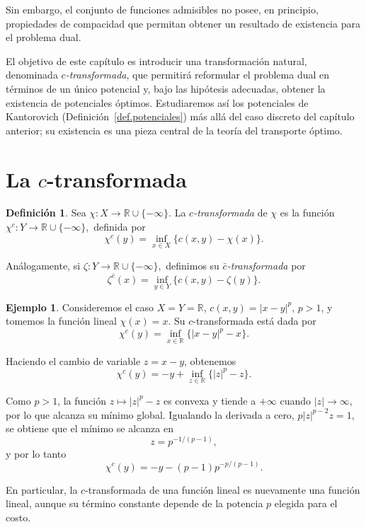 \documentclass[12pt, a4paper]{amsbook}
\newcommand{\R}{{\mathbb R}}
\theoremstyle{remark}
\theoremstyle{definition}
\newtheorem{defi}[teo]{Definición}
\newtheorem{ejem}[teo]{Ejemplo}
\numberwithin{section}{chapter}
\numberwithin{subsection}{section}
\numberwithin{equation}{section}
\numberwithin{figure}{chapter}
\begin{document}
Sin embargo, el conjunto de funciones admisibles no posee, en principio,
propiedades de compacidad que permitan obtener un resultado de existencia para
el problema dual.

El objetivo de este capítulo es introducir una transformación natural,
denominada \emph{\(c\)-transformada}, que permitirá reformular el problema dual
en términos de un único potencial y, bajo las hipótesis adecuadas, obtener la existencia de potenciales óptimos. Estudiaremos así los potenciales de Kantorovich (Definición~\ref{def.potenciales}) más allá del caso discreto del capítulo anterior; su existencia es una pieza central de la teoría del transporte óptimo.


\section{La \(c\)-transformada}

\begin{defi}
Sea
\(
\chi\colon X\longrightarrow\R\cup\{-\infty\}.
\)
La \emph{\(c\)-transformada} de $\chi$ es la función
\(
\chi^c\colon Y\longrightarrow\R\cup\{-\infty\},
\)
definida por
\[
\chi^c(y)
=
\inf_{x\in X}
\bigl\{
c(x,y)-\chi(x)
\bigr\}.
\]

Análogamente, si
\(
\zeta\colon Y\longrightarrow\R\cup\{-\infty\},
\)
definimos su \emph{\(\bar c\)-transformada} por
\[
\zeta^{\bar c}(x)
=
\inf_{y\in Y}
\bigl\{
c(x,y)-\zeta(y)
\bigr\}.
\]
\end{defi}

\begin{ejem}
Consideremos el caso $X=Y=\R$,
$c(x,y)=|x-y|^p$, $p>1$,
y tomemos la función lineal $\chi(x)=x$. Su $c$-transformada está dada por
\[
\chi^c(y)
=
\inf_{x\in\R}
\bigl\{
|x-y|^p-x
\bigr\}.
\]

Haciendo el cambio de variable $z=x-y$, obtenemos
\[
\chi^c(y)
=
-y+\inf_{z\in\R}
\bigl\{
|z|^p-z
\bigr\}.
\]

Como $p>1$, la función $z\mapsto|z|^p-z$ es convexa y tiende a $+\infty$
cuando $|z|\to\infty$, por lo que alcanza su mínimo global. Igualando la
derivada a cero, $p|z|^{p-2}z=1$, se obtiene que el mínimo se alcanza en
\[
z=p^{-1/(p-1)},
\]
y por lo tanto
\[
\chi^c(y)
=
-y-(p-1)p^{-p/(p-1)}.
\]

En particular, la $c$-transformada de una función lineal es nuevamente una
función lineal, aunque su término constante depende de la potencia $p$
elegida para el costo.
\end{ejem}
\end{document}
